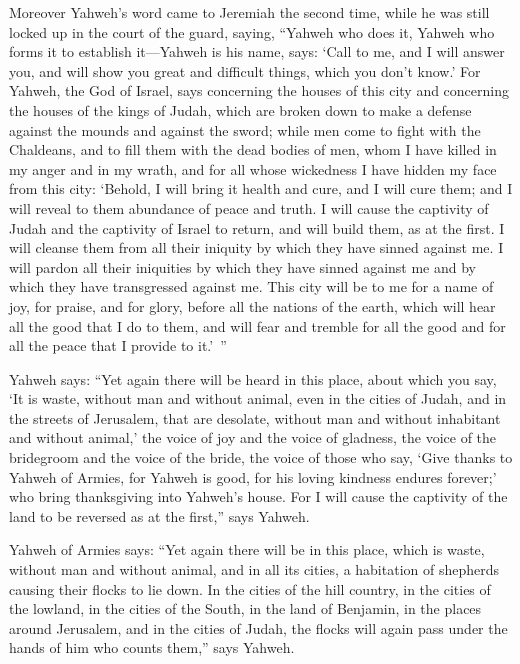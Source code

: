 {Moreover Yahweh’s word came to Jeremiah the second time, while he was still locked up in the court of the guard, saying,
“Yahweh who does it, Yahweh who forms it to establish it—Yahweh is his name, says:
‘Call to me, and I will answer you, and will show you great and difficult things, which you don’t know.’
For Yahweh, the God of Israel, says concerning the houses of this city and concerning the houses of the kings of Judah, which are broken down to make a defense against the mounds and against the sword;
while men come to fight with the Chaldeans, and to fill them with the dead bodies of men, whom I have killed in my anger and in my wrath, and for all whose wickedness I have hidden my face from this city:
‘Behold, I will bring it health and cure, and I will cure them; and I will reveal to them abundance of peace and truth.
I will cause the captivity of Judah and the captivity of Israel to return, and will build them, as at the first.
I will cleanse them from all their iniquity by which they have sinned against me. I will pardon all their iniquities by which they have sinned against me and by which they have transgressed against me.
This city will be to me for a name of joy, for praise, and for glory, before all the nations of the earth, which will hear all the good that I do to them, and will fear and tremble for all the good and for all the peace that I provide to it.’ ”
\par }{\PP {}Yahweh says: “Yet again there will be heard in this place, about which you say, ‘It is waste, without man and without animal, even in the cities of Judah, and in the streets of Jerusalem, that are desolate, without man and without inhabitant and without animal,’
the voice of joy and the voice of gladness, the voice of the bridegroom and the voice of the bride, the voice of those who say, ‘Give thanks to Yahweh of Armies, for Yahweh is good, for his loving kindness endures forever;’ who bring thanksgiving into Yahweh’s house. For I will cause the captivity of the land to be reversed as at the first,” says Yahweh.
\par }{\PP {}Yahweh of Armies says: “Yet again there will be in this place, which is waste, without man and without animal, and in all its cities, a habitation of shepherds causing their flocks to lie down.
In the cities of the hill country, in the cities of the lowland, in the cities of the South, in the land of Benjamin, in the places around Jerusalem, and in the cities of Judah, the flocks will again pass under the hands of him who counts them,” says Yahweh.
}
